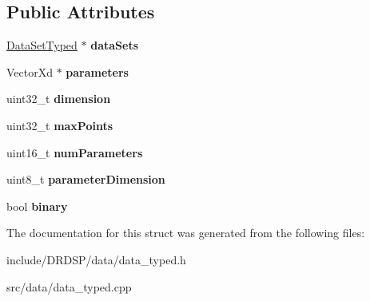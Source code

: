 \subsection*{Public Attributes}
\begin{DoxyCompactItemize}
\item 
\hypertarget{struct_d_r_d_s_p_1_1_data_system_typed_a19267fafd70c07c177b9992468704504}{\hyperlink{struct_d_r_d_s_p_1_1_data_set_typed}{Data\-Set\-Typed} $\ast$ {\bfseries data\-Sets}}\label{struct_d_r_d_s_p_1_1_data_system_typed_a19267fafd70c07c177b9992468704504}

\item 
\hypertarget{struct_d_r_d_s_p_1_1_data_system_typed_a14e96a1e32444f7a799e3d5552317aa5}{Vector\-Xd $\ast$ {\bfseries parameters}}\label{struct_d_r_d_s_p_1_1_data_system_typed_a14e96a1e32444f7a799e3d5552317aa5}

\item 
\hypertarget{struct_d_r_d_s_p_1_1_data_system_typed_a2b4eaddeb36714703850fdb92050ca0a}{uint32\-\_\-t {\bfseries dimension}}\label{struct_d_r_d_s_p_1_1_data_system_typed_a2b4eaddeb36714703850fdb92050ca0a}

\item 
\hypertarget{struct_d_r_d_s_p_1_1_data_system_typed_a02ab7e32e3df6e667e176144520c339c}{uint32\-\_\-t {\bfseries max\-Points}}\label{struct_d_r_d_s_p_1_1_data_system_typed_a02ab7e32e3df6e667e176144520c339c}

\item 
\hypertarget{struct_d_r_d_s_p_1_1_data_system_typed_a965e1066f9c4449413add3978a4cb0af}{uint16\-\_\-t {\bfseries num\-Parameters}}\label{struct_d_r_d_s_p_1_1_data_system_typed_a965e1066f9c4449413add3978a4cb0af}

\item 
\hypertarget{struct_d_r_d_s_p_1_1_data_system_typed_af3b60c8a97dc029652d551b7cdd34be4}{uint8\-\_\-t {\bfseries parameter\-Dimension}}\label{struct_d_r_d_s_p_1_1_data_system_typed_af3b60c8a97dc029652d551b7cdd34be4}

\item 
\hypertarget{struct_d_r_d_s_p_1_1_data_system_typed_ae8a12c2b02ef3ddb0bf370a2461a2201}{bool {\bfseries binary}}\label{struct_d_r_d_s_p_1_1_data_system_typed_ae8a12c2b02ef3ddb0bf370a2461a2201}

\end{DoxyCompactItemize}


The documentation for this struct was generated from the following files\-:\begin{DoxyCompactItemize}
\item 
include/\-D\-R\-D\-S\-P/data/data\-\_\-typed.\-h\item 
src/data/data\-\_\-typed.\-cpp\end{DoxyCompactItemize}
